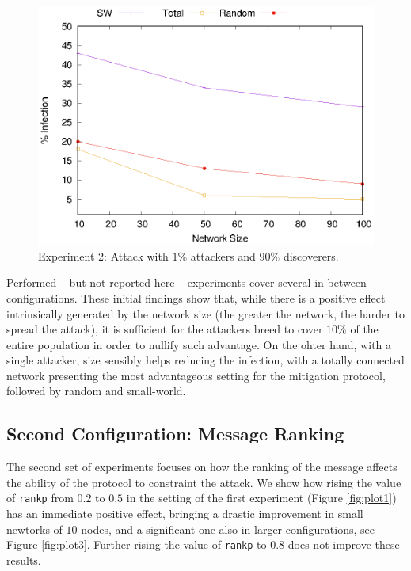 \documentclass[compsoc, conference, letterpaper, 10pt, times]{IEEEtran}
\begin{document}
\begin{figure}
\includegraphics[scale=0.70]{1stconfig_1_90}
\caption{Experiment 2: Attack with $1\%$ attackers and $90\%$ discoverers.}\label{fig:plot2}
\end{figure}
Performed -- but not reported here -- experiments cover several in-between configurations. These initial findings show that, while there is a positive effect intrinsically generated by the network size (the greater the network, the harder to spread the attack), it is sufficient for the attackers breed to cover $10\%$ of the entire population in order to nullify such advantage. On the ohter hand, with a single attacker, size sensibly helps reducing the infection, with a totally connected network presenting the most advantageous setting for the mitigation protocol, followed by random and small-world.

\subsection{Second Configuration: Message Ranking}

The second set of experiments focuses on how the ranking of the message affects the ability of the protocol to constraint the attack. We show how rising the value of \texttt{rankp} from $0.2$ to $0.5$ in the setting of the first experiment (Figure \ref{fig:plot1}) has an immediate positive effect, bringing a drastic improvement in small newtorks of $10$ nodes, and a significant one also in larger configurations, see Figure \ref{fig:plot3}. Further rising the value of \texttt{rankp} to $0.8$ does not improve these results.
\end{document}
